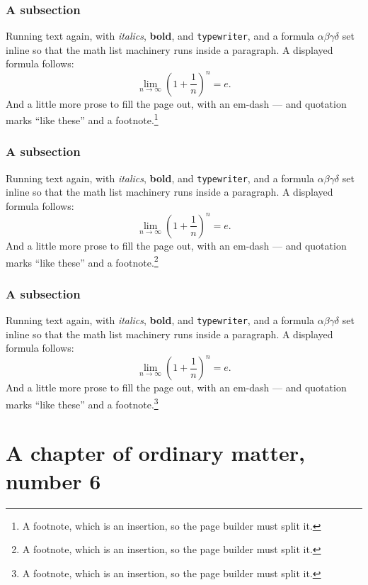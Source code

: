 \documentclass[11pt,a4paper]{report}
\theoremstyle{plain}
\begin{document}
\subsection{A subsection}
Running text again, with \textit{italics}, \textbf{bold}, and
\texttt{typewriter}, and a formula $\alpha\beta\gamma\delta$ set inline so
that the math list machinery runs inside a paragraph. A displayed formula
follows:
\[ \lim_{n\to\infty}\left(1+\frac{1}{n}\right)^{n}=e . \]
And a little more prose to fill the page out, with an em-dash --- and
quotation marks ``like these'' and a footnote.\footnote{A footnote, which is
an insertion, so the page builder must split it.}
\subsection{A subsection}
Running text again, with \textit{italics}, \textbf{bold}, and
\texttt{typewriter}, and a formula $\alpha\beta\gamma\delta$ set inline so
that the math list machinery runs inside a paragraph. A displayed formula
follows:
\[ \lim_{n\to\infty}\left(1+\frac{1}{n}\right)^{n}=e . \]
And a little more prose to fill the page out, with an em-dash --- and
quotation marks ``like these'' and a footnote.\footnote{A footnote, which is
an insertion, so the page builder must split it.}
\subsection{A subsection}
Running text again, with \textit{italics}, \textbf{bold}, and
\texttt{typewriter}, and a formula $\alpha\beta\gamma\delta$ set inline so
that the math list machinery runs inside a paragraph. A displayed formula
follows:
\[ \lim_{n\to\infty}\left(1+\frac{1}{n}\right)^{n}=e . \]
And a little more prose to fill the page out, with an em-dash --- and
quotation marks ``like these'' and a footnote.\footnote{A footnote, which is
an insertion, so the page builder must split it.}
\chapter{A chapter of ordinary matter, number 6}
\end{document}
